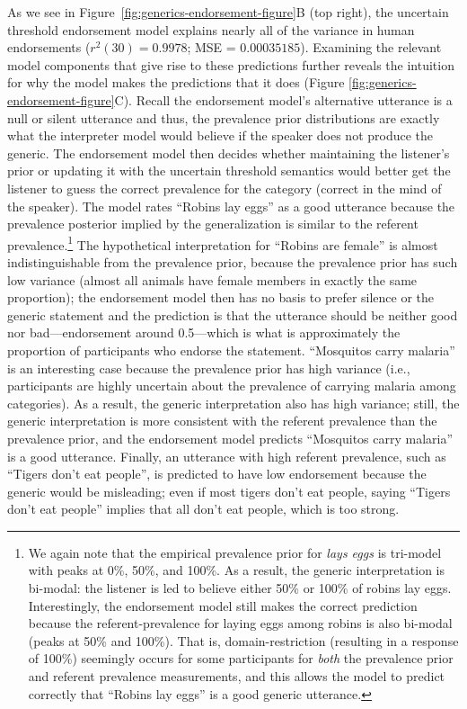 \documentclass[english,,man,floatsintext]{apa6}
\let\rmarkdownfootnote\footnote%
\def\footnote{\protect\rmarkdownfootnote}
\theoremstyle{definition}
\theoremstyle{definition}
\theoremstyle{definition}
\theoremstyle{remark}
\begin{document}
As we see in Figure~\ref{fig:generics-endorsement-figure}B (top right),
the uncertain threshold endorsement model explains nearly all of the
variance in human endorsements (\(r^2(30) = 0.9978\); MSE =
\(0.00035185\)). Examining the relevant model components that give rise
to these predictions further reveals the intuition for why the model
makes the predictions that it does (Figure
\ref{fig:generics-endorsement-figure}C). Recall the endorsement model's
alternative utterance is a null or silent utterance and thus, the
prevalence prior distributions are exactly what the interpreter model
would believe if the speaker does not produce the generic. The
endorsement model then decides whether maintaining the listener's prior
or updating it with the uncertain threshold semantics would better get
the listener to guess the correct prevalence for the category (correct
in the mind of the speaker). The model rates \enquote{Robins lay eggs}
as a good utterance because the prevalence posterior implied by the
generalization is similar to the referent prevalence.\footnote{We again
  note that the empirical prevalence prior for \emph{lays eggs} is
  tri-model with peaks at 0\%, 50\%, and 100\%. As a result, the generic
  interpretation is bi-modal: the listener is led to believe either 50\%
  or 100\% of robins lay eggs. Interestingly, the endorsement model
  still makes the correct prediction because the referent-prevalence for
  laying eggs among robins is also bi-modal (peaks at 50\% and 100\%).
  That is, domain-restriction (resulting in a response of 100\%)
  seemingly occurs for some participants for \emph{both} the prevalence
  prior and referent prevalence measurements, and this allows the model
  to predict correctly that \enquote{Robins lay eggs} is a good generic
  utterance.} The hypothetical interpretation for \enquote{Robins are
female} is almost indistinguishable from the prevalence prior, because
the prevalence prior has such low variance (almost all animals have
female members in exactly the same proportion); the endorsement model
then has no basis to prefer silence or the generic statement and the
prediction is that the utterance should be neither good nor
bad---endorsement around 0.5---which is what is approximately the
proportion of participants who endorse the statement. \enquote{Mosquitos
carry malaria} is an interesting case because the prevalence prior has
high variance (i.e., participants are highly uncertain about the
prevalence of carrying malaria among categories). As a result, the
generic interpretation also has high variance; still, the generic
interpretation is more consistent with the referent prevalence than the
prevalence prior, and the endorsement model predicts \enquote{Mosquitos
carry malaria} is a good utterance. Finally, an utterance with high
referent prevalence, such as \enquote{Tigers don't eat people}, is
predicted to have low endorsement because the generic would be
misleading; even if most tigers don't eat people, saying \enquote{Tigers
don't eat people} implies that all don't eat people, which is too
strong.
\end{document}
